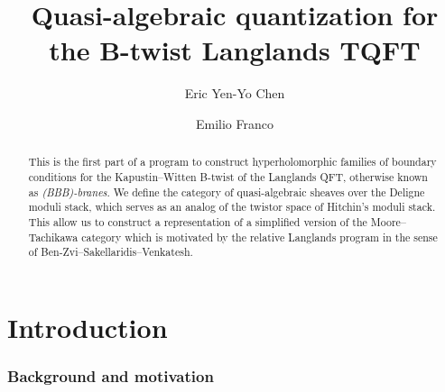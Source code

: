 \documentclass[11pt, a4paper]{amsart}
\numberwithin{equation}{section}
\theoremstyle{definition}
\theoremstyle{remark}
\begin{document}
\author[E. Chen]{Eric Yen-Yo Chen}
\address{E. Y. Chen, \newline\indent \'Ecole Polytechnique F\'ed\'erale de Lausanne, 
\newline\indent CH-1015 Lausanne, Switzerland.}


\author[E. Franco]{Emilio Franco}
\address{E. Franco,
\newline\indent Depto. Matem\'aticas, Facultad de Ciencias, 
\newline\indent Universidad Aut\'onoma de Madrid
\newline\indent Campus de Cantoblanco 28049, Madrid, Espa\~na.}

\title{Quasi-algebraic quantization for the B-twist Langlands TQFT}

\begin{abstract}
This is the first part of a program to construct hyperholomorphic families of boundary conditions for the Kapustin--Witten B-twist of the Langlands QFT, otherwise known as \textit{(BBB)-branes}. We define the category of quasi-algebraic sheaves over the Deligne moduli stack, which serves as an analog of the twistor space of Hitchin's moduli stack. This allow us to construct a representation of a simplified version of the Moore--Tachikawa category which is motivated by the relative Langlands program in the sense of Ben-Zvi--Sakellaridis--Venkatesh.
\end{abstract}


\maketitle


\begingroup
\hypersetup{linkcolor=black}
\tableofcontents
\endgroup

\section{Introduction}




\subsubsection*{Background and motivation}
\end{document}
